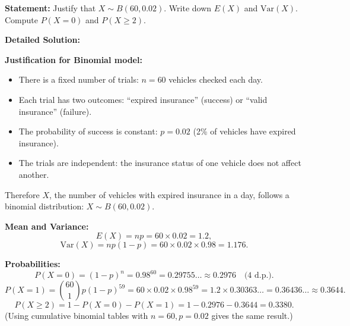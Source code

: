 \documentclass[11pt]{article}
\begin{document}
\begin{exoresolu}
\textbf{Statement:} Justify that $X \sim B(60, 0.02)$. Write down $E(X)$ and $\mathrm{Var}(X)$. Compute $P(X = 0)$ and $P(X \geq 2)$.

\tcblower
\textbf{Detailed Solution:}

\textbf{Justification for Binomial model:}
\begin{itemize}
\item There is a fixed number of trials: $n = 60$ vehicles checked each day.
\item Each trial has two outcomes: ``expired insurance'' (success) or ``valid insurance'' (failure).
\item The probability of success is constant: $p = 0.02$ (2\% of vehicles have expired insurance).
\item The trials are independent: the insurance status of one vehicle does not affect another.
\end{itemize}
Therefore $X$, the number of vehicles with expired insurance in a day, follows a binomial distribution: $X \sim B(60, 0.02)$.

\textbf{Mean and Variance:}
\[
E(X) = np = 60 \times 0.02 = 1.2,
\]
\[
\mathrm{Var}(X) = np(1-p) = 60 \times 0.02 \times 0.98 = 1.176.
\]

\textbf{Probabilities:}
\[
P(X = 0) = (1-p)^n = 0.98^{60} = 0.29755\ldots \approx 0.2976 \quad \text{(4 d.p.)}.
\]
\[
P(X = 1) = \binom{60}{1} p (1-p)^{59} = 60 \times 0.02 \times 0.98^{59} = 1.2 \times 0.30363\ldots = 0.36436\ldots \approx 0.3644.
\]
\[
P(X \geq 2) = 1 - P(X=0) - P(X=1) = 1 - 0.2976 - 0.3644 = 0.3380.
\]
(Using cumulative binomial tables with $n=60, p=0.02$ gives the same result.)
\end{exoresolu}
\end{document}
